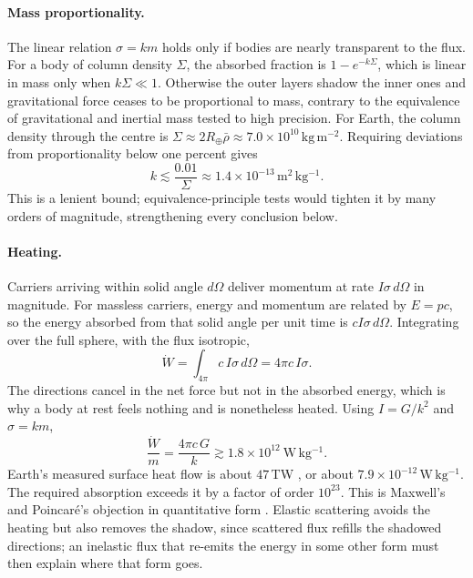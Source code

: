 \documentclass[11pt]{article}
\begin{document}
\paragraph{Mass proportionality.} The linear relation $\sigma = km$ holds only if bodies are nearly transparent to the flux. For a body of column density $\Sigma$, the absorbed fraction is $1 - e^{-k\Sigma}$, which is linear in mass only when $k\Sigma \ll 1$. Otherwise the outer layers shadow the inner ones and gravitational force ceases to be proportional to mass, contrary to the equivalence of gravitational and inertial mass tested to high precision. For Earth, the column density through the centre is $\Sigma \approx 2R_\oplus \bar\rho \approx 7.0\times10^{10}\,\mathrm{kg\,m^{-2}}$. Requiring deviations from proportionality below one percent gives
\begin{equation}
k \lesssim \frac{0.01}{\Sigma} \approx 1.4\times10^{-13}\,\mathrm{m^2\,kg^{-1}}.
\end{equation}
This is a lenient bound; equivalence-principle tests would tighten it by many orders of magnitude, strengthening every conclusion below.

\paragraph{Heating.} Carriers arriving within solid angle $d\Omega$ deliver momentum at rate $I\sigma\,d\Omega$ in magnitude. For massless carriers, energy and momentum are related by $E = pc$, so the energy absorbed from that solid angle per unit time is $cI\sigma\,d\Omega$. Integrating over the full sphere, with the flux isotropic,
\begin{equation}
\dot W = \int_{4\pi} c\,I\sigma\,d\Omega = 4\pi c\,I\sigma.
\end{equation}
The directions cancel in the net force but not in the absorbed energy, which is why a body at rest feels nothing and is nonetheless heated. Using $I = G/k^2$ and $\sigma = km$,
\begin{equation}
\frac{\dot W}{m} = \frac{4\pi c\, G}{k} \gtrsim 1.8\times10^{12}\ \mathrm{W\,kg^{-1}}.
\end{equation}
Earth's measured surface heat flow is about $47\,$TW \cite{davies2010}, or about $7.9\times10^{-12}\,\mathrm{W\,kg^{-1}}$. The required absorption exceeds it by a factor of order $10^{23}$. This is Maxwell's and Poincaré's objection in quantitative form \cite{maxwell1875,poincare1908}. Elastic scattering avoids the heating but also removes the shadow, since scattered flux refills the shadowed directions; an inelastic flux that re-emits the energy in some other form must then explain where that form goes.
\end{document}
